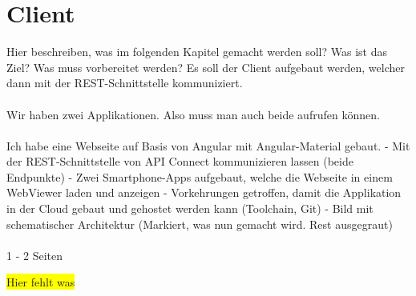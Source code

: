 \chapter{Client}
Hier beschreiben, was im folgenden Kapitel gemacht werden soll? Was ist das Ziel? Was muss vorbereitet werden?
Es soll der Client aufgebaut werden, welcher dann mit der REST-Schnittstelle kommuniziert.
\\ \\
Wir haben zwei Applikationen. Also muss man auch beide aufrufen können.
\\ \\
Ich habe eine Webseite auf Basis von Angular mit Angular-Material gebaut. - Mit der REST-Schnittstelle von API Connect
kommunizieren lassen (beide Endpunkte) - Zwei Smartphone-Apps aufgebaut,
welche die Webseite in einem WebViewer laden und anzeigen - Vorkehrungen getroffen, damit die Applikation in der Cloud
gebaut und gehostet werden kann (Toolchain, Git) - Bild mit schematischer Architektur (Markiert, was nun gemacht wird.
Rest ausgegraut)
\\ \\
1 - 2 Seiten

\colorbox{yellow}{Hier fehlt was}
